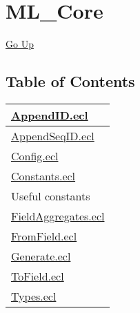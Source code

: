 \chapter*{\color{headtoc} ML\_Core}
\hypertarget{ecldoc:toc:root/ML_Core}{}
\hyperlink{ecldoc:toc:}{Go Up}


\section*{Table of Contents}
{\renewcommand{\arraystretch}{1.5}
\begin{longtable}{|p{\textwidth}|}
\hline
\hyperlink{ecldoc:toc:ML_Core.AppendID}{AppendID.ecl} \\
\hline
\hyperlink{ecldoc:toc:ML_Core.AppendSeqID}{AppendSeqID.ecl} \\
\hline
\hyperlink{ecldoc:toc:ML_Core.Config}{Config.ecl} \\
\hline
\hyperlink{ecldoc:toc:ML_Core.Constants}{Constants.ecl} \\
Useful constants \\
\hline
\hyperlink{ecldoc:toc:ML_Core.FieldAggregates}{FieldAggregates.ecl} \\
\hline
\hyperlink{ecldoc:toc:ML_Core.FromField}{FromField.ecl} \\
\hline
\hyperlink{ecldoc:toc:ML_Core.Generate}{Generate.ecl} \\
\hline
\hyperlink{ecldoc:toc:ML_Core.ToField}{ToField.ecl} \\
\hline
\hyperlink{ecldoc:toc:ML_Core.Types}{Types.ecl} \\
\hline
\end{longtable}
}










